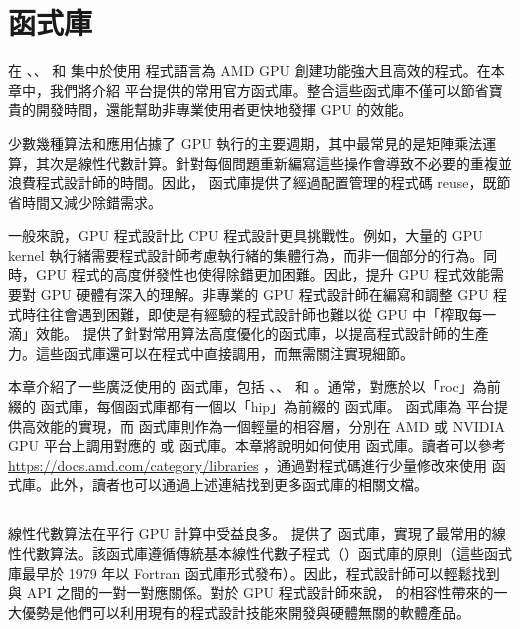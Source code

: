 \chapter{ 函式庫}
\label{chap:ROCm 函式庫}
在 、、 和  集中於使用  程式語言為 AMD GPU 創建功能強大且高效的程式。在本章中，我們將介紹  平台提供的常用官方函式庫。整合這些函式庫不僅可以節省寶貴的開發時間，還能幫助非專業使用者更快地發揮 GPU 的效能。

少數幾種算法和應用佔據了 GPU 執行的主要週期，其中最常見的是矩陣乘法運算，其次是線性代數計算。針對每個問題重新編寫這些操作會導致不必要的重複並浪費程式設計師的時間。因此， 函式庫提供了經過配置管理的程式碼 reuse，既節省時間又減少除錯需求。

一般來說，GPU 程式設計比 CPU 程式設計更具挑戰性。例如，大量的 GPU kernel 執行緒需要程式設計師考慮執行緒的集體行為，而非一個部分的行為。同時，GPU 程式的高度併發性也使得除錯更加困難。因此，提升 GPU 程式效能需要對 GPU 硬體有深入的理解。非專業的 GPU 程式設計師在編寫和調整 GPU 程式時往往會遇到困難，即使是有經驗的程式設計師也難以從 GPU 中「榨取每一滴」效能。 提供了針對常用算法高度優化的函式庫，以提高程式設計師的生產力。這些函式庫還可以在程式中直接調用，而無需關注實現細節。

本章介紹了一些廣泛使用的  函式庫，包括 、、 和 。通常，對應於以「roc」為前綴的  函式庫，每個函式庫都有一個以「hip」為前綴的  函式庫。 函式庫為  平台提供高效能的實現，而  函式庫則作為一個輕量的相容層，分別在 AMD 或 NVIDIA GPU 平台上調用對應的  或  函式庫。本章將說明如何使用  函式庫。讀者可以參考 \url{https://docs.amd.com/category/libraries}
，通過對程式碼進行少量修改來使用  函式庫。此外，讀者也可以通過上述連結找到更多函式庫的相關文檔。

\section{}
線性代數算法在平行 GPU 計算中受益良多。 提供了  函式庫，實現了最常用的線性代數算法。該函式庫遵循傳統基本線性代數子程式（）函式庫的原則（這些函式庫最早於 1979 年以 Fortran 函式庫形式發布）。因此，程式設計師可以輕鬆找到  與  API 之間的一對一對應關係。對於 GPU 程式設計師來說， 的相容性帶來的一大優勢是他們可以利用現有的程式設計技能來開發與硬體無關的軟體產品。

